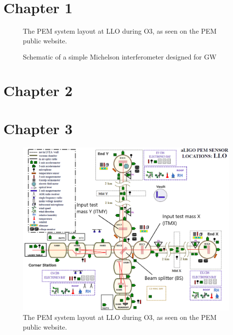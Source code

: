 \documentclass[11pt]{article}
\begin{document}


\section{Chapter 1}

\begin{figure}[h!]
	\centering
	\caption{
		The PEM system layout at LLO during O3, as seen on the PEM public website.}
	\label{fig:gw_polarization}
\end{figure}

\begin{figure}[h!]
	\centering
	\caption{
		Schematic of a simple Michelson interferometer designed for GW}
	\label{fig:gw_polarization}
\end{figure}

\section{Chapter 2}

\section{Chapter 3}

\begin{figure}[h!]
	\centering
	\includegraphics[width=\textwidth]{figures/pem-channels.png}
	\caption{
		The PEM system layout at LLO during O3, as seen on the PEM public website.}
	\label{fig:pem_channels}
\end{figure}
\end{document}
